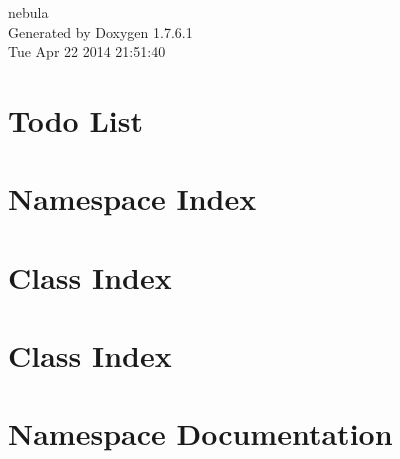 \documentclass[a4paper]{book}
\begin{document}
\hypersetup{pageanchor=false,citecolor=blue}
\begin{titlepage}
\vspace*{7cm}
\begin{center}
{\Large nebula }\\
\vspace*{1cm}
{\large \-Generated by Doxygen 1.7.6.1}\\
\vspace*{0.5cm}
{\small Tue Apr 22 2014 21:51:40}\\
\end{center}
\end{titlepage}
\clearemptydoublepage
{}
\tableofcontents
\clearemptydoublepage
{}
\hypersetup{pageanchor=true,citecolor=blue}
\chapter{\-Todo \-List}
\label{todo}
\hypertarget{todo}{}

\chapter{\-Namespace \-Index}

\chapter{\-Class \-Index}

\chapter{\-Class \-Index}

\chapter{\-Namespace \-Documentation}







\end{document}
